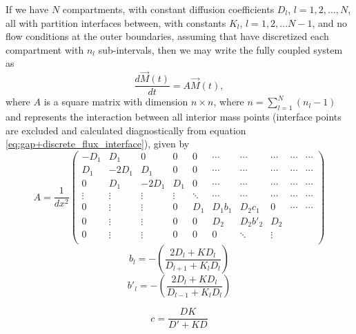 \documentclass[final,1p,times]{elsarticle}
\begin{document}
If we have $N$ compartments, with constant diffusion coefficients $D_l$, $l=1,2,...,N$, all with partition interfaces between, with constants $K_l$, $l=1,2,...N-1$, and no flow conditions at the outer boundaries, assuming that have discretized each compartment with $n_l$ sub-intervals, then we may write the fully coupled system as
\begin{equation}
\frac{d \vec{M}(t)}{dt}=A\vec{M}(t),
\end{equation}
where $A$ is a square matrix with dimension $n\times n$, where $n=\sum_{l=1}^{N}(n_l-1)$ and represents the interaction between all interior mass points (interface points are excluded and calculated diagnostically from equation \eqref{eq:gap+discrete_flux_interface}), given by
\begin{equation}
A=
\frac{1}{dx^2}
\begin{pmatrix}
-D_1 & D_1 & 0 & 0& 0 &  \cdots & \cdots &  \cdots& \cdots &\cdots \\
D_1 & -2D_1 & D_1 & 0 & 0 & \cdots & \cdots &  \cdots & \cdots & \cdots \\
0 & D_1 & -2D_1 & D_1 & 0 & \cdots & \cdots &  \cdots & \cdots & \cdots \\
\vdots  & \vdots & \vdots & \vdots & \ddots & \cdots & \cdots &  \cdots & \cdots& \cdots  \\
0 & \vdots & \vdots& 0 & D_1 & D_1b_1 & D_2c_1 & 0& \cdots & \cdots\\
0 & \vdots  & \vdots &0 & 0 & D_2 & D_2 b'_2 & D_2 \\
0  & \vdots &\vdots  & 0 & 0 & 0 & \ddots & \vdots  \\
\end{pmatrix}
\end{equation}
\begin{equation}
b_l=-\left(\frac{2D_l+KD_l}{D_{l+1}+K_lD_l}\right)
\end{equation}
\begin{equation}
b'_l=-\left(\frac{2D_l+KD_l}{D_{l-1}+K_lD_l}\right)
\end{equation}

\begin{equation}
c=\frac{D K }{D'+KD}
\end{equation}
\end{document}
